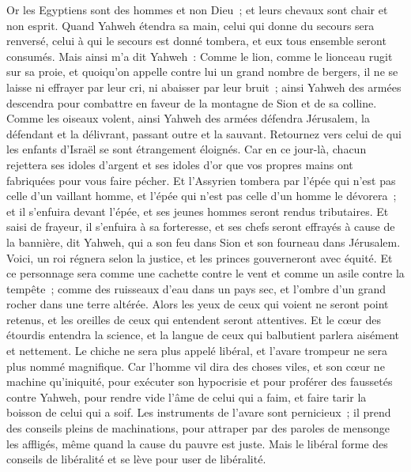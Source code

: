 \begin{multicols}{2}
Or les Egyptiens sont des hommes et non Dieu~; et leurs chevaux sont chair et non esprit. Quand Yahweh étendra sa main, celui qui donne du secours sera renversé, celui à qui le secours est donné tombera, et eux tous ensemble seront consumés.
Mais ainsi m'a dit Yahweh~: Comme le lion, comme le lionceau rugit sur sa proie, et quoiqu'on appelle contre lui un grand nombre de bergers, il ne se laisse ni effrayer par leur cri, ni abaisser par leur bruit~; ainsi Yahweh des armées descendra pour combattre en faveur de la montagne de Sion et de sa colline.
Comme les oiseaux volent, ainsi Yahweh des armées défendra Jérusalem, la défendant et la délivrant, passant outre et la sauvant.
Retournez vers celui de qui les enfants d'Israël se sont étrangement éloignés.
Car en ce jour-là, chacun rejettera ses idoles d'argent et ses idoles d'or que vos propres mains ont fabriquées pour vous faire pécher.
Et l'Assyrien tombera par l'épée qui n'est pas celle d'un vaillant homme, et l'épée qui n'est pas celle d'un homme le dévorera~; et il s'enfuira devant l'épée, et ses jeunes hommes seront rendus tributaires.
Et saisi de frayeur, il s'enfuira à sa forteresse, et ses chefs seront effrayés à cause de la bannière, dit Yahweh, qui a son feu dans Sion et son fourneau dans Jérusalem.
\VerseOne{}Voici, un roi régnera selon la justice, et les princes gouverneront avec équité.
Et ce personnage sera comme une cachette contre le vent et comme un asile contre la tempête~; comme des ruisseaux d'eau dans un pays sec, et l'ombre d'un grand rocher dans une terre altérée.
Alors les yeux de ceux qui voient ne seront point retenus, et les oreilles de ceux qui entendent seront attentives.
Et le cœur des étourdis entendra la science, et la langue de ceux qui balbutient parlera aisément et nettement.
Le chiche ne sera plus appelé libéral, et l'avare trompeur ne sera plus nommé magnifique.
Car l'homme vil dira des choses viles, et son cœur ne machine qu'iniquité, pour exécuter son hypocrisie et pour proférer des faussetés contre Yahweh, pour rendre vide l'âme de celui qui a faim, et faire tarir la boisson de celui qui a soif.
Les instruments de l'avare sont pernicieux~; il prend des conseils pleins de machinations, pour attraper par des paroles de mensonge les affligés, même quand la cause du pauvre est juste.
Mais le libéral forme des conseils de libéralité et se lève pour user de libéralité.

\end{multicols}
